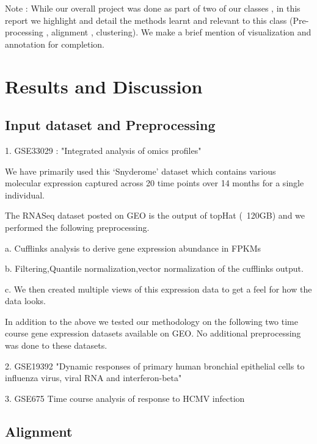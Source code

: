 \documentclass[aps,prd,final,onecolumn,a4paper,10pt]{revtex4}
\begin{document}
  Note : While our overall project was done as part of two of our classes , in this report we highlight and detail the methods learnt and relevant to this class (Pre-processing , alignment , clustering). We make a brief mention of visualization and annotation for completion.

\section{Results and Discussion}
\subsection{Input dataset and Preprocessing}
\begin{description}
 \item 1. GSE33029 : "Integrated analysis of omics profiles"
 
 We have primarily used this ‘Snyderome’ dataset which contains various molecular expression captured across 20 time points over 14 months for a single individual.

The RNASeq dataset posted on GEO is the output of topHat (~120GB) and we performed the following preprocessing.
\begin{description}
 \item a. Cufflinks analysis to derive gene expression abundance in FPKMs
 \item b. Filtering,Quantile normalization,vector normalization of the cufflinks output.
 \item c. We then created multiple views of this expression data to get a feel for how the
		data looks.
\end{description}


In addition to the above we tested our methodology on the following two time course gene expression datasets available on GEO. No additional preprocessing was done to these datasets.

 \item 2. GSE19392 "Dynamic responses of primary human bronchial epithelial cells to influenza virus, viral RNA and interferon-beta"
 \item 3. GSE675 Time course analysis of response to HCMV infection
\end{description}


\subsection{Alignment}
\end{document}
